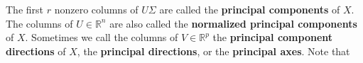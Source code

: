 %
%
%
%
%
%
% 
% 
%
%

The first \(r\) nonzero columns of \(U \Sigma\) are called the \textbf{principal components} of \(X\). The columns of \(U \in \mathbb{R}^n\) are also called the \textbf{normalized principal components} of \(X\). Sometimes we call the columns of \(V \in \mathbb{R}^p\) the \textbf{principal component directions} of \(X\), the \textbf{principal directions}, or the \textbf{principal axes}. Note that 

